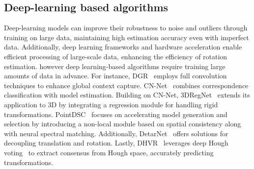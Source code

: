 \subsection{Deep-learning based algorithms}
Deep-learning models can improve their robustness to noise and outliers through training on large data, maintaining high estimation accuracy even with imperfect data. Additionally, deep learning frameworks and hardware acceleration enable efficient processing of large-scale data, enhancing the efficiency of rotation estimation. however deep learning-based algorithms require training large amounts of data in advance. For instance, DGR~\cite{2020Deep} employs full convolution techniques to enhance global context capture. CN-Net~\cite{yi2018learning} combines correspondence classification with model estimation. Building on CN-Net, 3DRegNet~\cite{20193DRegNet} extends its application to 3D by integrating a regression module for handling rigid transformations. PointDSC~\cite{2021PointDSC} focuses on accelerating model generation and selection by introducing a non-local module based on spatial consistency along with neural spectral matching. Additionally, DetarNet~\cite{chen2022detarnet} offers solutions for decoupling translation and rotation. Lastly, DHVR~\cite{2021Deep} leverages deep Hough voting~\cite{qi2019deep} to extract consensus from Hough space, accurately predicting transformations.
